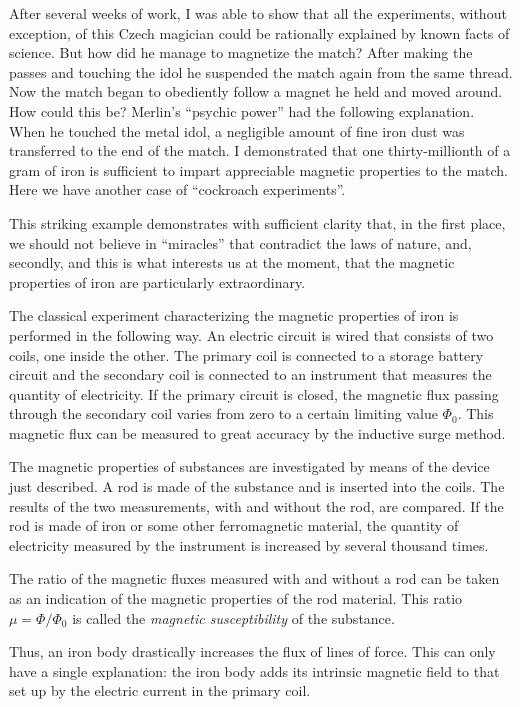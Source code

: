 After several weeks of work, I was able to show that all the experiments, without exception, of this Czech magician could be rationally explained by known facts of science. But how did he manage to magnetize the match? After making the passes and touching the idol he suspended the match again from the same thread. Now the match began to obediently follow a magnet he held and moved around. How could this be?
Merlin's ``psychic power'' had the following explanation. When he touched the metal idol, a negligible amount of fine iron dust was transferred to the end of the match. I demonstrated that one thirty-millionth of a gram of iron is sufficient to impart appreciable magnetic properties to the match. Here we have another case of ``cockroach experiments''.

This striking example demonstrates with sufficient clarity that, in the first place, we should not believe in ``miracles'' that contradict the laws of nature, and, secondly, and this is what interests us at the moment, that the magnetic properties of iron are particularly extraordinary.

The classical experiment characterizing the magnetic properties of iron is performed in the following way. An electric circuit is wired that consists of two coils, one inside the other. The primary coil is connected to a storage battery circuit and the secondary coil is connected to an instrument that measures the quantity of electricity. If the primary circuit is closed, the magnetic flux passing through the secondary coil varies from zero to a certain limiting value $\Phi_{0}$. This magnetic flux can be measured to great accuracy by the inductive surge method.

The magnetic properties of substances are investigated by means of the device just described. A rod is made of the substance and is inserted into the coils. The results of the two measurements, with and without the rod, are compared. If the rod is made of iron or some other ferromagnetic material, the quantity of electricity measured by the instrument is increased by several thousand times.

The ratio of the magnetic fluxes measured with and without a rod can be taken as an indication of the magnetic properties of the rod material. This ratio $\mu  = \Phi/\Phi_{0}$ is called the \emph{magnetic susceptibility} of the substance.

Thus, an iron body drastically increases the flux of lines of force. This can only have a single explanation: the iron body adds its intrinsic magnetic field to that set up by the electric current in the primary coil.

